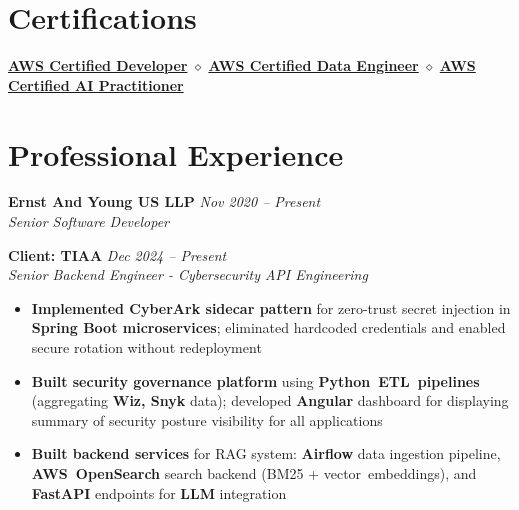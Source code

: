 \documentclass[11pt,a4paper]{article}
\newcommand{\resumeItem}[1]{\item\small{#1}}
\newcommand{\resumeItemList}[1]{\begin{itemize}[leftmargin=0.5in, itemsep=0.25em, parsep=0pt, partopsep=0pt, topsep=0.25em]
    \small
    #1
\end{itemize}}
\begin{document}
\section{Certifications}
\begin{center}
    \small\href{https://www.credly.com/badges/aa170f9b-6c94-465f-b497-0b8e4cf93297/public_url}{\textbf{AWS Certified Developer}} \hspace{0.3em} $\diamond$ \hspace{0.3em} \href{https://www.credly.com/badges/6ec4ce21-91d8-4bb5-9867-b936f250ded0/public_url}{\textbf{AWS Certified Data Engineer}} \hspace{0.3em} $\diamond$ \hspace{0.3em} \href{https://www.credly.com/badges/09a07b44-fd10-48ff-a694-604c6f9628a7/public_url}{\textbf{AWS Certified AI Practitioner}}
\end{center}

\section{Professional Experience}

\textbf{Ernst And Young US LLP} \hfill \textit{Nov 2020 -- Present}\\
\textit{Senior Software Developer}

\textbf{Client: TIAA} \hfill \textit{Dec 2024 -- Present}\\
\textit{Senior Backend Engineer - Cybersecurity API Engineering}
\resumeItemList{
    \resumeItem{\textbf{Implemented CyberArk sidecar pattern} for zero-trust secret injection in \textbf{Spring Boot microservices}; eliminated hardcoded credentials and enabled secure rotation without redeployment}
    \resumeItem{\textbf{Built security governance platform} using \textbf{Python~ETL~pipelines} (aggregating \textbf{Wiz, Snyk} data); developed \textbf{Angular} dashboard for displaying summary of security posture visibility for all applications}
    \resumeItem{\textbf{Built backend services} for RAG system: \textbf{Airflow} data ingestion pipeline, \textbf{AWS~OpenSearch} search backend (BM25 + vector~embeddings), and \textbf{FastAPI} endpoints for \textbf{LLM} integration}
}
\vspace{0.4em}
\end{document}
